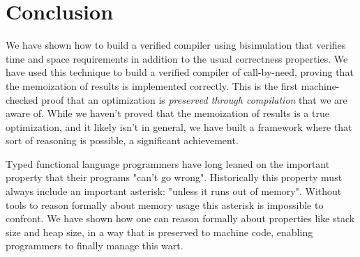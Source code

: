 \section{Conclusion}

We have shown how to build a verified compiler using bisimulation that verifies
time and space requirements in addition to the usual correctness properties. We
have used this technique to build a verified compiler of call-by-need, proving
that the memoization of results is implemented correctly. This is the first
machine-checked proof that an optimization is \emph{preserved through
compilation} that we are aware of. While we haven't proved that the memoization
of results is a true optimization, and it likely isn't in general, we have built
a framework where that sort of reasoning is possible, a significant achievement. 

Typed functional language programmers have long leaned on the important property
that their programs "can't go wrong". Historically this property must always
include an important asterisk: "unless it runs out of memory". Without tools to
reason formally about memory usage this asterisk is impossible to confront. We
have shown how one can reason formally about properties like stack size and heap
size, in a way that is preserved to machine code, enabling programmers to
finally manage this wart.

